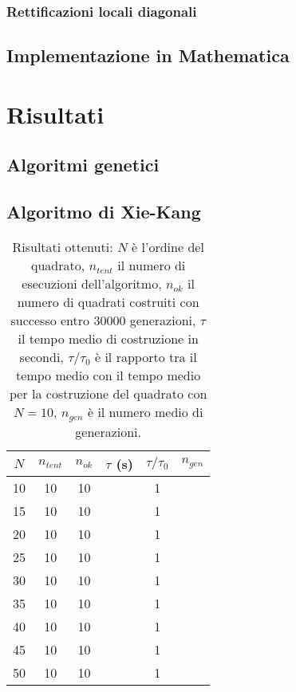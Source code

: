\documentclass[italian,twoside,twocolumn]{article}
\begin{document}
\subsubsection{Rettificazioni locali diagonali}

\subsection{Implementazione in Mathematica}



\section{Risultati}

\subsection{Algoritmi genetici}



\subsection{Algoritmo di Xie-Kang}

\begin{table}
	\centering
	\caption{Risultati ottenuti: $ N $ è l'ordine del quadrato, $ n_{tent} $ il numero di esecuzioni dell'algoritmo, $ n_{ok} $ il numero di quadrati costruiti con successo entro 30000 generazioni, $ \tau $ il tempo medio di costruzione in secondi, $ \tau \slash \tau_0 $ è il rapporto tra il tempo medio con il tempo medio per la costruzione del quadrato con $ N = 10 $, $ n_{gen} $ è il numero medio di generazioni.}
\begin{tabular}{c|ccccc}
	\hline
	$ N $ & $ n_{tent} $ & $ n_{ok} $ & $ \tau $ (s) & $ \tau \slash \tau_0 $ & $ n_{gen} $ \\ \hline
	 10   &      10      &     10     &              &           1            &  \\ 
	 15   &      10      &     10     &              &           1            &  \\ 
	 20   &      10      &     10     &              &           1            &  \\ 
	 25   &      10      &     10     &              &           1            &  \\ 
	 30   &      10      &     10     &              &           1            &  \\ 
	 35   &      10      &     10     &              &           1            &  \\ 
	 40   &      10      &     10     &              &           1            &  \\ 
	 45   &      10      &     10     &              &           1            &  \\ 
	 50   &      10      &     10     &              &           1            &  \\ \hline
\end{tabular} 
\label{tab:risultati_xie_kang}
\end{table}
\end{document}
